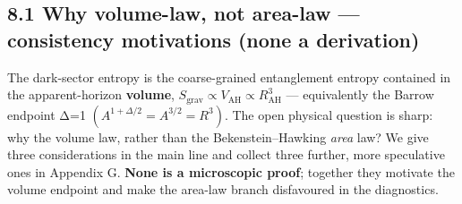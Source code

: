 \documentclass[
  10pt,
]{article}
\begin{document}
\subsection{8.1 Why volume-law, not area-law --- consistency motivations
(none a
derivation)}\label{why-volume-law-not-area-law-consistency-motivations-none-a-derivation}

The dark-sector entropy is the coarse-grained entanglement entropy
contained in the apparent-horizon \textbf{volume},
\(S_{\mathrm{grav}} \propto  V_{\mathrm{AH}} \propto  R_{\mathrm{AH}}^{3}\)
--- equivalently the Barrow endpoint Δ=1
\((A^{1+\Delta /2} = A^{3/2} = R^{3})\). The open physical question is
sharp: why the volume law, rather than the Bekenstein--Hawking
\emph{area} law? We give three considerations in the main line and
collect three further, more speculative ones in Appendix G. \textbf{None
is a microscopic proof}; together they motivate the volume endpoint and
make the area-law branch disfavoured in the diagnostics.
\end{document}
